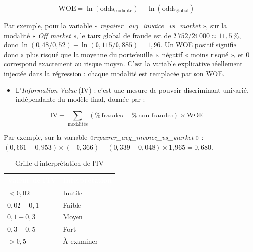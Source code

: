 \begin{equation}
    \text{WOE} = \ln(\text{odds}_{\text{modalité}}) - \ln(\text{odds}_{\text{global}})
\end{equation}

\textcolor{vert}{Par exemple, pour la variable « \textit{repairer\_avg\_invoice\_vs\_market} », sur la modalité « \textit{Off market} », le taux global de fraude est de $2\,752 / 24\,000 \approx 11,5~\%$, donc $\ln(0,48 / 0,52) - \ln(0,115 / 0,885) = 1,96$}. Un WOE positif signifie donc « plus risqué que la moyenne du portefeuille », négatif « moins risqué », et 0 correspond exactement au risque moyen. C'est la variable explicative réellement injectée dans la régression : chaque modalité est remplacée par son WOE.

\begin{itemize}[label=$\bullet$]
    \item L'\textit{Information Value} (IV) : c'est une mesure de pouvoir discriminant univarié, indépendante du modèle final, donnée par :
\end{itemize}

\begin{equation}
    \text{IV} = \sum_{\text{modalités}} (\%\,\text{fraudes} - \%\,\text{non-fraudes}) \times \text{WOE}
\end{equation}

\textcolor{vert}{Par exemple, sur la variable «\textit{repairer\_avg\_invoice\_vs\_market} » : $(0,661 - 0,953) \times (-0,366) + (0,339 - 0,048) \times 1,965 = 0,680$.}

\begin{table}[H]
    \centering
    \renewcommand{\arraystretch}{1.3}
    \begin{tabularx}{0.7\textwidth}{|>{\raggedright\arraybackslash}X|>{\raggedright\arraybackslash}X|}
        \hline
        \rowcolor{accenture}
        \textcolor{white}{\textbf{Valeur de l'IV}} & \textcolor{white}{\textbf{Interprétation}} \\
        \hline
        $< 0,02$ & Inutile \\
        \hline
        $0,02 - 0,1$ & Faible \\
        \hline
        $0,1 - 0,3$ & Moyen \\
        \hline
        $0,3 - 0,5$ & Fort \\
        \hline
        $> 0,5$ & À examiner \\
        \hline
    \end{tabularx}
    \caption{Grille d'interprétation de l'IV}
    \label{tab:interpretation-iv}
\end{table}

